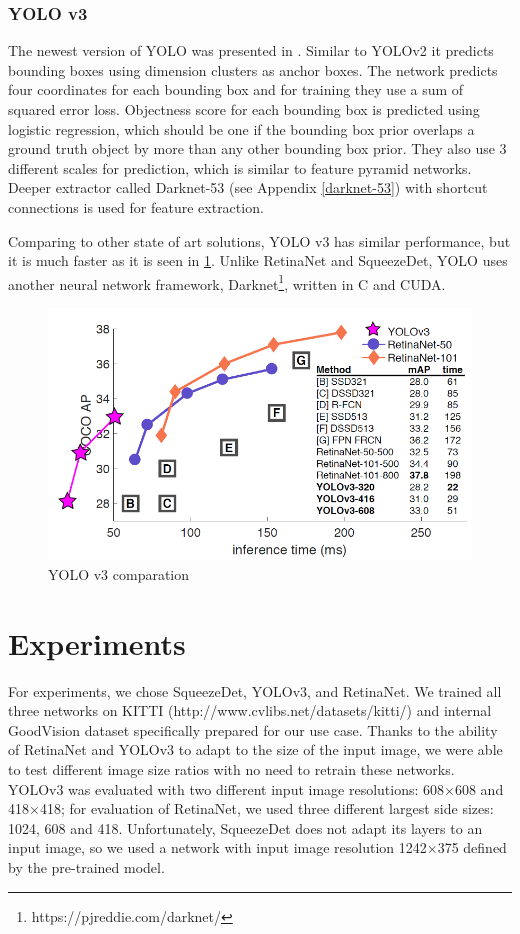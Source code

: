 \documentclass[twoside]{ctuthesis}
\theoremstyle{plain}
\theoremstyle{definition}
\theoremstyle{note}
\begin{document}
\subsection{YOLO v3}
The newest version of YOLO was presented in \cite{Redmon2018YOLOv3AI}. Similar to YOLOv2 it predicts bounding boxes using dimension clusters as anchor boxes. The network predicts four coordinates for each bounding box and for training they use a sum of squared error loss. Objectness score for each bounding box is predicted using logistic regression, which should be one if the bounding box prior overlaps a ground truth object by more than any other bounding box prior. 
They also use 3 different scales for prediction, which is similar to feature pyramid networks. Deeper extractor called Darknet-53 (see Appendix \ref{darknet-53}) with shortcut connections is used for feature extraction.

Comparing to other state of art solutions, YOLO v3 has similar performance, but it is much faster as it is seen in \ref{yolov3-compare}.
Unlike RetinaNet and SqueezeDet, YOLO uses another neural network framework, Darknet\footnote{https://pjreddie.com/darknet/}, written in C and CUDA. 
\begin{figure}[h]
\caption{YOLO v3 comparation}
\label{yolov3-compare}
\includegraphics[width=\textwidth]{images/used_networks/yolov3_comparasion.png}
\end{figure}
\chapter{Experiments}
For experiments, we chose SqueezeDet, YOLOv3, and RetinaNet. We trained all three networks on KITTI (http://www.cvlibs.net/datasets/kitti/) and internal GoodVision dataset specifically prepared for our use case. Thanks to the ability of RetinaNet and YOLOv3 to adapt to the size of the input image, we were able to test different image size ratios with no need to retrain these networks.  YOLOv3 was evaluated with two different input image resolutions: 608$\times$608 and 418$\times$418; for evaluation of RetinaNet, we used three different largest side sizes: 1024, 608 and 418. Unfortunately, SqueezeDet does not adapt its layers to an input image, so we used a network with input image resolution 1242$\times$375 defined by the pre-trained model.
\end{document}
